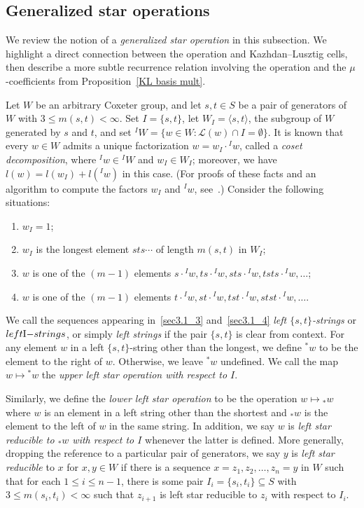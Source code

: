 \documentclass[10pt]{article}
\theoremstyle{definition}
\newcommand{\se}{\subseteq}
\begin{document}
 \subsection{Generalized star operations}
 \label{star}
 We review the notion of a
 \emph{generalized star operation} in this subsection. We highlight a
 direct connection between the operation and Kazhdan--Lusztig cells, then describe
 a more subtle recurrence relation involving the operation and the
 $\mu$-coefficients from Proposition~\ref{KL basis mult}. 

 Let $W$ be an arbitrary Coxeter group, and let $s,t\in S$ be a pair of
 generators of $W$ with $3\le m(s,t)<\infty$. Set $I=\{s,t\}$, let $W_I=\langle
 s,t\rangle$, the subgroup of $W$ generated by $s$ and $t$, and set ${}^I W=\{w\in
 W: \mathcal{L}(w)\cap I=\emptyset\}$. It is known that every $w\in W$ admits a unique
 factorization $w=w_I\cdot {}^I w$, called a \emph{coset decomposition}, where
 ${}^I w\in {}^I W$ and $w_I\in W_I$; moreover, we have $l(w)=l(w_I) +
 l({}^Iw)$ in this case. (For proofs
 of these facts and an algorithm to compute the factors $w_I$ and
 ${}^I w$, see~\cite[Proposition~2.4.4]{BB}.) Consider the following situations:
 \begin{enumerate}
 \item\label{sec3.1_1} $w_I=1$;
 \item\label{sec3.1_2} $w_I$ is the longest element $sts\cdots$ of length $m(s,t)$ in
 $W_I$;
 \item\label{sec3.1_3} $w$ is one of the $(m-1)$ elements $s\cdot {}^Iw, ts\cdot {}^Iw,
 sts\cdot {}^I
 w,tsts\cdot {}^I w,\ldots$;
 \item\label{sec3.1_4} $w$ is one of the $(m-1)$ elements $t\cdot {}^Iw, st\cdot {}^Iw,
 tst\cdot {}^I 
 w,stst\cdot {}^I w,\ldots$.
 \end{enumerate}
 We call the sequences appearing in~\eqref{sec3.1_3} and~\eqref{sec3.1_4} \emph{left
 $\{s,t\}$-strings} or $\emph{left $I$-strings}$, or simply
 \emph{left strings} if the pair $\{s,t\}$ is clear from context. For any element $w$ in a left
 $\{s,t\}$-string other than the longest, we define ${}^* w$ to be the
 element to the right of $w$. Otherwise, we leave ${}^* w$ undefined. We call
 the map $w\mapsto {}^* w$ the \emph{upper left star operation with respect
 to $I$}. 

 Similarly, we define the \emph{lower left
 star operation} to be the operation $w\mapsto {}_* w$ where $w$ is an element
 in a left string other than the shortest and ${}_* w$ is the element to the
 left of $w$ in the same string. In addition, we say $w$ is \emph{left star reducible to ${}_*
 w$ with respect to $I$} whenever the latter is defined. More generally,
 dropping the reference to a particular pair of generators, we
 say $y$ is \emph{left star reducible} to $x$ for $x,y\in W$ if there is a sequence
 $x=z_1,z_2,\ldots,z_n=y$ in $W$ such that for each $1\le i\le n-1$, there is
 some pair $I_i=\{s_i,t_i\}\se S$ with $3\le m(s_i,t_i)<\infty$ such that
 $z_{i+1}$ is left star reducible to $z_i$ with respect to $I_i$.
\end{document}
